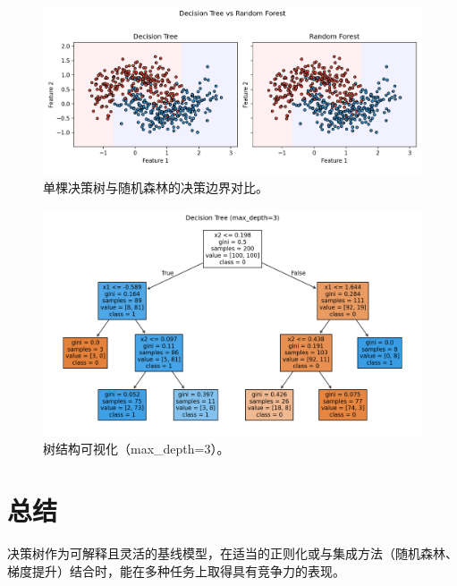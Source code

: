 \documentclass[UTF8,zihao=-4]{ctexart}
\begin{document}
\begin{figure}[H]
  \centering
  \includegraphics[width=0.95\linewidth]{dt_vs_rf_boundary.png}
  \caption{单棵决策树与随机森林的决策边界对比。}
  \label{fig:dt_vs_rf_cn}
\end{figure}
\FloatBarrier

\begin{figure}[H]
  \centering
  \includegraphics[width=0.95\linewidth]{dt_tree_plot.png}
  \caption{树结构可视化（max\_depth=3）。}
  \label{fig:treeplot_cn}
\end{figure}
\FloatBarrier

\section{总结}
决策树作为可解释且灵活的基线模型，在适当的正则化或与集成方法（随机森林、梯度提升）结合时，能在多种任务上取得具有竞争力的表现。
\end{document}
